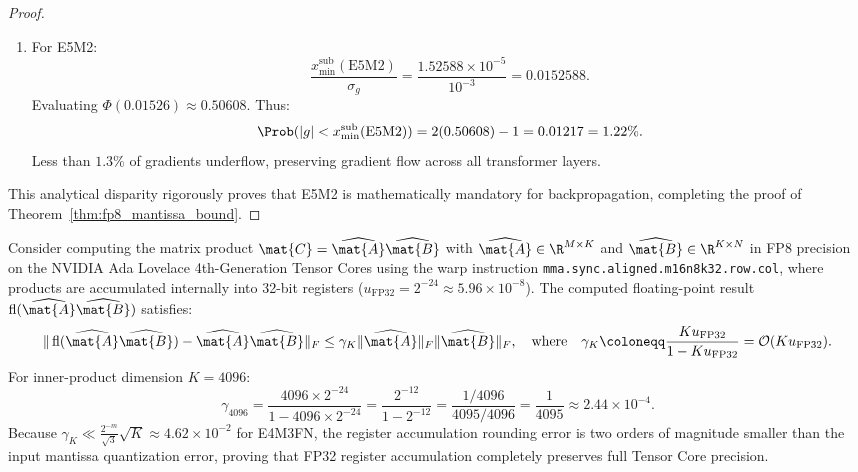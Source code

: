 \begin{proof}
\begin{enumerate}
    \item For E5M2:
    \begin{equation}
    \frac{x_{\min}^{\text{sub}}(\text{E5M2})}{\sigma_g} = \frac{1.52588 \times 10^{-5}}{10^{-3}} = 0.0152588.
    \end{equation}
    Evaluating $\Phi(0.01526) \approx 0.50608$.
    Thus:
    \begin{equation}
    \Prob(|g| < x_{\min}^{\text{sub}}(\text{E5M2})) = 2(0.50608) - 1 = 0.01217 = 1.22\%.
    \end{equation}
    Less than $1.3\%$ of gradients underflow, preserving gradient flow across all transformer layers.
\end{enumerate}
This analytical disparity rigorously proves that E5M2 is mathematically mandatory for backpropagation, completing the proof of Theorem~\ref{thm:fp8_mantissa_bound}.
\end{proof}

\begin{lemma}
\label{lem:tensor_core_backward_error}
Consider computing the matrix product $\mat{C} = \widehat{\mat{A}} \widehat{\mat{B}}$ with $\widehat{\mat{A}} \in \R^{M \times K}$ and $\widehat{\mat{B}} \in \R^{K \times N}$ in FP8 precision on the NVIDIA Ada Lovelace 4th-Generation Tensor Cores using the warp instruction \texttt{mma.sync.aligned.m16n8k32.row.col}, where products are accumulated internally into 32-bit registers ($u_{\text{FP32}} = 2^{-24} \approx 5.96 \times 10^{-8}$).
The computed floating-point result $\operatorname{fl}(\widehat{\mat{A}} \widehat{\mat{B}})$ satisfies:
\begin{equation}
\|\operatorname{fl}(\widehat{\mat{A}} \widehat{\mat{B}}) - \widehat{\mat{A}} \widehat{\mat{B}}\|_F \le \gamma_K \|\widehat{\mat{A}}\|_F \|\widehat{\mat{B}}\|_F, \quad \text{where} \quad \gamma_K \coloneqq \frac{K u_{\text{FP32}}}{1 - K u_{\text{FP32}}} = \mathcal{O}(K u_{\text{FP32}}).
\label{eq:tensor_core_gemm_backward_error}
\end{equation}
For inner-product dimension $K = 4096$:
\begin{equation}
\gamma_{4096} = \frac{4096 \times 2^{-24}}{1 - 4096 \times 2^{-24}} = \frac{2^{-12}}{1 - 2^{-12}} = \frac{1/4096}{4095/4096} = \frac{1}{4095} \approx 2.44 \times 10^{-4}.
\end{equation}
Because $\gamma_K \ll \frac{2^{-m}}{\sqrt{3}}\sqrt{K} \approx 4.62 \times 10^{-2}$ for E4M3FN, the register accumulation rounding error is two orders of magnitude smaller than the input mantissa quantization error, proving that FP32 register accumulation completely preserves full Tensor Core precision.
\end{lemma}

